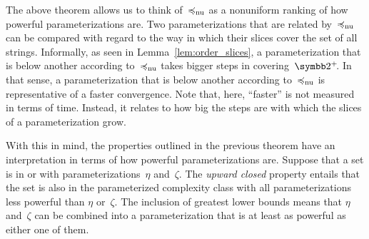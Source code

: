 \label{p:powerful_nuparameterizations}%
The above theorem allows us to think of~$\preccurlyeq_\mathrm{nu}$ as a nonuniform ranking of how powerful parameterizations are.
Two parameterizations that are related by~$\preccurlyeq_\mathrm{nu}$ can be compared with regard to the way in which their slices cover the set of all strings.
Informally, as seen in Lemma~\ref{lem:order_slices}, a parameterization that is below another according to~$\preccurlyeq_\mathrm{nu}$ takes bigger steps in covering~$\binary^+\!$.
In that sense, a parameterization that is below another according to~$\preccurlyeq_\mathrm{nu}$ is representative of a faster convergence.
Note that, here, \enquote{faster} is not measured in terms of time.
Instead, it relates to how big the steps are with which the slices of a parameterization grow.

With this in mind, the properties outlined in the previous theorem have an interpretation in terms of how powerful parameterizations are.
Suppose that a set is in  or  with parameterizations~$\eta$ and~$\zeta$.
The \emph{upward closed} property entails that the set is also in the parameterized complexity class with all parameterizations less powerful than $\eta$ or~$\zeta$.
The inclusion of greatest lower bounds means that $\eta$ and~$\zeta$ can be combined into a parameterization that is at least as powerful as either one of them.

